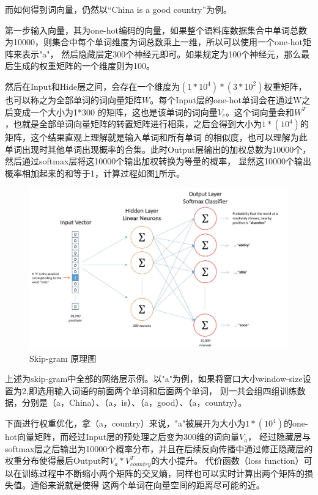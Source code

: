 \documentclass[supercite]{HustGraduPaper}
\theoremstyle{definition}
\begin{document}
而如何得到词向量，仍然以“China is a good country”为例。

第一步输入向量，其为one-hot编码的向量，如果整个语料库数据集合中单词总数为10000，则集合中每个单词维度为词总数乘上一维，所以可以使用一个one-hot矩阵来表示"a"，
然后隐藏层定300个神经元即可。如果规定为100个神经元，那么最后生成的权重矩阵的一个维度则为100。

然后在Input和Hide层之间，会存在一个维度为$(1*10^4)*(3*10^2)$权重矩阵，也可以称之为全部单词的词向量矩阵$W$。每个Input层的one-hot单词会在通过W之后变成一个大小为1*300
的矩阵，这也是该单词的词向量$V_c$。这个词向量会和$W^T$，也就是全部单词向量矩阵的转置矩阵进行相乘，之后会得到大小为$1*(10^4)$的矩阵，这个结果直观上理解就是输入单词和所有单词
的相似度，也可以理解为此单词出现时其他单词出现概率的合集。此时Output层输出的加权总数为10000个，然后通过softmax层将这10000个输出加权转换为等量的概率，
显然这10000个输出概率相加起来的和等于1，计算过程如图\ref{Fig.skipgram}所示。

\begin{figure}[htbp] %
  \centering %
  \includegraphics[width=1\textwidth]{images/skip-gram.png} %
  \caption{Skip-gram 原理图} %
  \label{Fig.skipgram} %
\end{figure}

上述为skip-gram中全部的网络层示例。以"a"为例，如果将窗口大小window-size设置为2,即选用输入词语的前面两个单词和后面两个单词，
则一共会组四组训练数据，分别是（a，China）、（a，is）、（a，good）、（a，country）。

下面进行权重优化，拿（a，country）来说，"a"被展开为大小为$1*(10^4)$的one-hot向量矩阵，而经过Input层的预处理之后变为300维的词向量$V_{a}$，
经过隐藏层与softmax层之后输出为10000个概率分布，并且在后续反向传播中通过修正隐藏层的权重分布使得最后Output时$V_{a} * V_{country}^T$的大小提升。
代价函数（loss function）可以在训练过程中不断缩小两个矩阵的交叉熵，同样也可以实时计算出两个矩阵的损失值。通俗来说就是使得
这两个单词在向量空间的距离尽可能的近。
\end{document}
